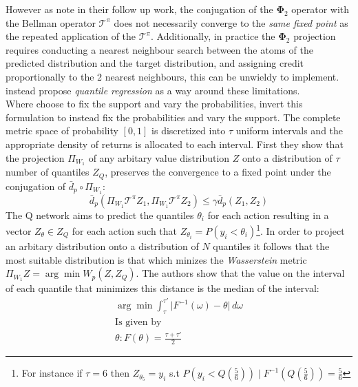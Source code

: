 However as \cite{Dabney2017} note in their follow up work, the conjugation of the $\mathbf{\Phi}_2$ operator with the Bellman operator $\mathcal{T}^\pi$
does not necessarily converge to the \emph{same fixed point} as the repeated application of the $\mathcal{T}^\pi$. Additionally, in practice
the $\mathbf{\Phi}_2$ projection requires conducting a nearest neighbour search between the atoms of the predicted distribution
and the target distribution, and assigning credit proportionally to the 2 nearest neighbours, this can be unwieldy to implement.
\cite{Dabney2017} instead propose \emph{quantile regression} as a way around these limitations.\\

Where \cite{Bellemare2017} choose to fix the support and vary the probabilities,\cite{Dabney2017} invert
this formulation to instead fix the probabilities and vary the support. The complete metric space of
probability $[0,1]$ is discretized into $\tau$ uniform intervals and the appropriate density of returns 
is allocated to each interval. First they show that the projection $\Pi_{W_1}$ of any arbitary value distribution
$Z$ onto a distribution of $\tau$ number of quantiles $Z_Q$, preserves the convergence to a fixed point under the conjugation
of $\bar{d}_p \circ \Pi_{W_1}$:
\begin{equation}
    \bar{d}_p(\Pi_{W_1} \mathcal{T}^\pi Z_1,\Pi_{W_1} \mathcal{T}^\pi Z_2) \leqslant \gamma \bar{d}_p(Z_1, Z_2)
\end{equation}
The Q network aims to predict the quantiles $\theta_i$ for each action  resulting in a vector $Z_\theta \in Z_Q$
for each action such that $Z_{\theta_i} = P(y_i < \theta_i)$\footnote{For instance if $\tau = 6$ then $Z_{\theta_5} = y_i$ s.t $P(y_i < Q(\frac{5}{6})) \mid  F^{-1}(Q(\frac{5}{6})) = \frac{5}{6}$}. 
In order to project an arbitary distribution onto a distribution of $N$ quantiles
it follows that the most suitable distribution is that which minizes the \emph{Wasserstein} metric $\Pi_{W_1}Z= \arg \min W_p(Z, Z_Q)$. 
The authors show that the value on the interval of each quantile that minimizes this distance is the
median of the interval:
\begin{equation}
    \begin{gathered}
        \arg \min \int^{\tau'}_\tau \vert F^{-1}(\omega) - \theta \vert \, d\omega \\
        \text{Is given by} \\
        \theta : F(\theta) = \frac{\tau + \tau'}{2}
    \end{gathered}
\end{equation}
